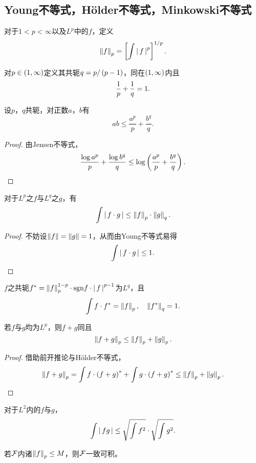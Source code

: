 \documentclass{ctexrep}
\begin{document}
  \subsection{Young不等式，H\"{o}lder不等式，Minkowski不等式}
  \begin{definition}
    对于$1<p<\infty$以及$L^p$中的$f$，定义
    \[ \left\| f \right\|_p = \left[\int \left|\, f \,\right|^p\right]^{1/p}.  \]
  \end{definition}
  \begin{definition}
    对$p\in\left(1,\infty\right)$定义其共轭$q=p/\left(p-1\right)$，同在$\left(1,\infty\right)$内且
    \[ \frac{1}{p}+\frac{1}{q}=1. \]
  \end{definition}
  \begin{theorem}[Young不等式]
    设$p$，$q$共轭，对正数$a$，$b$有
    \[ ab\le \frac{a^p}{p}+\frac{b^q}{q}. \]
  \end{theorem}
  \begin{proof}
    由Jensen不等式，
    \[ \frac{\log a^p}{p} + \frac{\log b^q}{q} \le \log\left(\frac{a^p}{p} + \frac{b^q}{q}\right). \qedhere \]
  \end{proof}
  \begin{theorem}[H\"{o}lder不等式]
    对于$L^p$之$f$与$L^q$之$g$，有
    \[ \int \left|\, f\cdot g \,\right| \le \left\| f \right\|_p \cdot\left\| g \right\|_q. \]
  \end{theorem}
  \begin{proof}
    不妨设$\left\| f \right\|=\left\| g \right\|=1$，从而由Young不等式易得
    \[ \int\left|\, f\cdot g \,\right| \le 1. \qedhere \]
  \end{proof}
  \begin{collary}
    $f$之共轭$f^* = \left\| f \right\|^{1-p}_p\cdot\mathrm{sgn}{f}\cdot\left|\, f \,\right|^{p-1}$为$L^q$，且
    \[ \int f\cdot f^* = \left\| f \right\|_p,\quad \left\| f^* \right\|_q=1. \]
  \end{collary}
  \begin{theorem}[Minkowski不等式]
    若$f$与$g$均为$L^p$，则$f+g$同且
    \[ \left\| f+g \right\|_p \le \left\| f \right\|_p + \left\| g \right\|_p. \]
  \end{theorem}
  \begin{proof}
    借助前开推论与H\"{o}lder不等式，
    \[ \left\| f+g \right\|_p = \int f\cdot\left(f+g\right)^* + \int g\cdot\left(f+g\right)^* \le \left\| f \right\|_p + \left\| g \right\|_p. \qedhere \]
  \end{proof}
  \begin{collary}
  对于$L^2$内的$f$与$g$，
    \[ \int\left|\, fg \,\right| \le \sqrt{\int f^2}\cdot\sqrt{\int g^2}. \]
  \end{collary}
  \begin{collary}
    \label{coll:lpui}
    若$\mathcal{F}$内诸$\left\| f \right\|_p\le M$，则$\mathcal{F}$一致可积。
  \end{collary}
\end{document}

